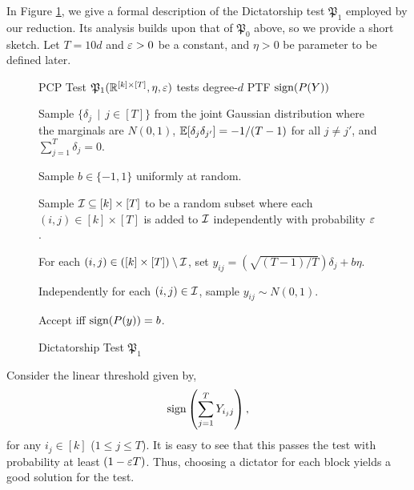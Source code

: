 In Figure \ref{fig:pcptest-1-intro}, 
we give a formal description of the Dictatorship test $\mathfrak{P}_1$
employed by our reduction. Its analysis builds upon that of
$\mathfrak{P}_0$ above, so we provide a short sketch.
Let $T = 10d$ and $\varepsilon > 0$ be a constant, and $\eta > 0$ be
parameter to be defined later.
\begin{figure}
\begin{mdframed}
\begin{center}PCP Test $\mathfrak{P}_1(\mathbb{R}^{[k]\times[T]}, \eta, \varepsilon)$ tests
degree-$d$ PTF
$\textnormal{sign}(P(Y))$ \end{center}

\begin{enumerate*}




 
\item Sample $\{\delta_{j}\, \mid\, j\in[T]\}$ from the joint Gaussian
	distribution where the marginals are $N(0,1)$,
	$\mathbb{E}[\delta_j\delta_{j'}] = -1/(T-1)$ for all $j\neq j'$, 
	and $\sum_{j=1}^T \delta_{j} = 0$. 





\item Sample $b \in \{-1,1\}$ uniformly at random.

\item Sample $\mathcal{I} \subseteq [k]\times[T]$ to be a random subset
where each $(i,j) \in [k]\times[T]$ is added to $\mathcal{I}$
independently with probability $\varepsilon$.

\item For each $(i,j) \in ([k]\times[T])\setminus \mathcal{I}$, set
$y_{ij} = (\sqrt{(T-1)/T})\delta_{j} +
b\eta$.

\item Independently for each $(i,j) \in \mathcal{I}$,
sample  $y_{ij} \sim N(0,{1})$. 


\item Accept iff $\textnormal{sign}(P(y)) = b$.

\end{enumerate*}
\end{mdframed}
\caption{Dictatorship Test $\mathfrak{P}_1$}
\label{fig:pcptest-1-intro}
\end{figure}
Consider the linear
threshold given by,
$$\textnormal{sign}\left(\sum_{j=1}^TY_{i_jj}\right),$$
for any $i_j \in [k]$ ($1\leq j \leq T$). It is easy to see that this
passes the test with probability at least $(1 - \varepsilon T)$. Thus,
choosing a dictator for each block yields a good solution for the
test.

